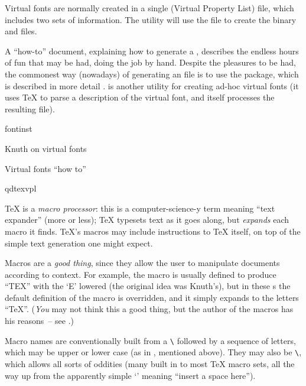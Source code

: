 Virtual fonts are normally created in a single  
(Virtual Property List) file, which includes two sets of information.
The  utility will use the  file to create
the binary  and  files.

A ``how-to'' document, explaining how to generate a ,
describes the endless hours of fun that may be had, doing the job by
hand.  Despite the pleasures to be had, the commonest way (nowadays)
of generating an  file is to use the 
 package, which is described in more detail
.
 is another utility for creating ad-hoc virtual
fonts (it uses \TeX{} to parse a description of the virtual font, and
 itself processes the resulting  file).
\begin{ctanrefs}
\item[fontinst]
\item[\nothtml{\rmfamily}Knuth on virtual fonts]
\item[\nothtml{\rmfamily}Virtual fonts ``how to'']
\item[qdtexvpl]
\end{ctanrefs}


\TeX{} is a \emph{macro processor}: this is a computer-science-y term
meaning ``text expander'' (more or less); \TeX{} typesets text as it
goes along, but \emph{expands} each macro it finds.  \TeX{}'s macros
may include instructions to \TeX{} itself, on top of the simple text
generation one might expect.

Macros are a \emph{good thing}, since they allow the user to
manipulate documents according to context.  For example, the macro
 is usually defined to produce ``TEX'' with the `E' lowered
(the original idea was Knuth's),
but in these s the default definition of the macro is
overridden, and it simply expands to the letters ``TeX''.  (\emph{You}
may not think this a good thing, but the author of the macros has his
reasons~-- see .)

Macro names are conventionally built from a \texttt{\textbackslash }
followed by a sequence of letters, which may be upper or lower case
(as in , mentioned above).  They may also be %
\texttt{\textbackslash {}}, which allows all
sorts of oddities (many built in to most \TeX{} macro sets, all the
way up from the apparently simple `\csx{ }' meaning ``insert a space
here'').

